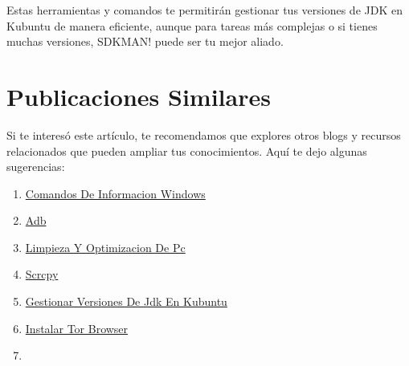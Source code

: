 \documentclass[
  jou,
  floatsintext,
  longtable,
  a4paper,
  nolmodern,
  notxfonts,
  notimes,
  12pt,
  colorlinks=true,linkcolor=blue,citecolor=blue,urlcolor=blue]{apa7}
\providecommand{\tightlist}{%
  \setlength{\itemsep}{0pt}\setlength{\parskip}{0pt}}
\begin{document}
Estas herramientas y comandos te permitirán gestionar tus versiones de
JDK en Kubuntu de manera eficiente, aunque para tareas más complejas o
si tienes muchas versiones, SDKMAN! puede ser tu mejor aliado.

\section{Publicaciones Similares}\label{publicaciones-similares}

Si te interesó este artículo, te recomendamos que explores otros blogs y
recursos relacionados que pueden ampliar tus conocimientos. Aquí te dejo
algunas sugerencias:

\begin{enumerate}
\def\labelenumi{\arabic{enumi}.}
\tightlist
\item
  \href{https://chaska-x.netlify.app/operating-system/2017-05-21-comandos-de-informacion-windows/index.pdf}{}
  \href{https://chaska-x.netlify.app/operating-system/2017-05-21-comandos-de-informacion-windows}{Comandos
  De Informacion Windows}
\item
  \href{https://chaska-x.netlify.app/operating-system/2019-06-19-adb/index.pdf}{}
  \href{https://chaska-x.netlify.app/operating-system/2019-06-19-adb}{Adb}
\item
  \href{https://chaska-x.netlify.app/operating-system/2021-08-17-limpieza-y-optimizacion-de-pc/index.pdf}{}
  \href{https://chaska-x.netlify.app/operating-system/2021-08-17-limpieza-y-optimizacion-de-pc}{Limpieza
  Y Optimizacion De Pc}
\item
  \href{https://chaska-x.netlify.app/operating-system/2021-10-21-scrcpy/index.pdf}{}
  \href{https://chaska-x.netlify.app/operating-system/2021-10-21-scrcpy}{Scrcpy}
\item
  \href{https://chaska-x.netlify.app/operating-system/2022-05-12-gestionar-versiones-de-jdk-en-kubuntu/index.pdf}{}
  \href{https://chaska-x.netlify.app/operating-system/2022-05-12-gestionar-versiones-de-jdk-en-kubuntu}{Gestionar
  Versiones De Jdk En Kubuntu}
\item
  \href{https://chaska-x.netlify.app/operating-system/2022-07-21-instalar-tor-browser/index.pdf}{}
  \href{https://chaska-x.netlify.app/operating-system/2022-07-21-instalar-tor-browser}{Instalar
  Tor Browser}
\item
  \href{https://chaska-x.netlify.app/operating-system/2022-08-14-crear-enlaces-duros-o-hard-link-en-linux/index.pdf}{}

\end{enumerate}
\end{document}
